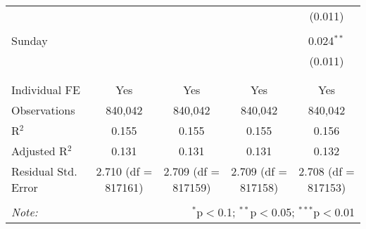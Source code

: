 \documentclass[
]{article}
\begin{document}
\begin{table}[!htbp]
{\begin{tabular}{@{\extracolsep{5pt}}lcccc}
  &  &  &  & (0.011) \\ 
  & & & & \\ 
 Sunday &  &  &  & 0.024$^{**}$ \\ 
  &  &  &  & (0.011) \\ 
  & & & & \\ 
\hline \\[-1.8ex] 
Individual FE & Yes & Yes & Yes & Yes \\ 
Observations & 840,042 & 840,042 & 840,042 & 840,042 \\ 
R$^{2}$ & 0.155 & 0.155 & 0.155 & 0.156 \\ 
Adjusted R$^{2}$ & 0.131 & 0.131 & 0.131 & 0.132 \\ 
Residual Std. Error & 2.710 (df = 817161) & 2.709 (df = 817159) & 2.709 (df = 817158) & 2.708 (df = 817153) \\ 
\hline 
\hline \\[-1.8ex] 
\textit{Note:}  & \multicolumn{4}{r}{$^{*}$p$<$0.1; $^{**}$p$<$0.05; $^{***}$p$<$0.01} \\ 
\end{tabular}
} 
\end{table} 
\newpage
\end{document}
